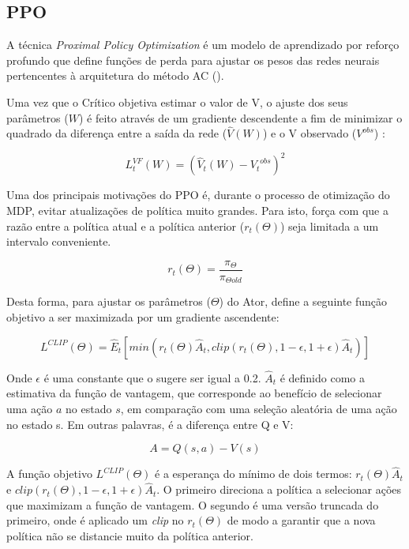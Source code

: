 \subsection{PPO}

A técnica \textit{Proximal Policy Optimization} é um modelo de aprendizado por reforço profundo que define funções de perda para ajustar os pesos das redes neurais pertencentes à arquitetura do método AC (\cite{PPO}). 

Uma vez que o Crítico objetiva estimar o valor de V, o ajuste dos seus parâmetros ($W$) é feito através de um gradiente descendente a fim de minimizar o quadrado da diferença entre a saída da rede ($\hat{V}(W)$) e o V observado ($V^{obs}$) \cite{PPO}:


\begin{equation}
    L^{VF}_t(W) = (\hat{V}_t(W) - {V_t}^{obs})^2 
\end{equation}

\noindent
Uma dos principais motivações do PPO é, durante o processo de otimização do MDP, evitar atualizações de política muito grandes. 
Para isto, \cite{PPO} força com que a razão entre a política atual e a política anterior ($r_t(\Theta)$) seja limitada a um intervalo conveniente. 

\begin{equation}
    r_t(\Theta) = \frac{\pi_\Theta}{\pi_{\Theta old}}
\end{equation}

\noindent
Desta forma, para ajustar os parâmetros ($\Theta$) do Ator, \cite{PPO} define a seguinte função objetivo a ser maximizada por um gradiente ascendente:

\begin{equation}
   L^{CLIP}(\Theta) = \hat{E}_t [min(r_t (\Theta) \hat{A}_t, clip(r_t (\Theta), 1-\epsilon, 1+\epsilon) \hat{A}_t)]
\end{equation}

\noindent
Onde $\epsilon$ é uma constante que o \cite{PPO} sugere ser igual a 0.2. $\hat{A}_t$ é definido como a estimativa da função de vantagem, que corresponde ao benefício de selecionar uma ação $a$ no estado $s$, em comparação com uma seleção aleatória de uma ação no estado s. Em outras palavras, é a diferença entre Q e V:

\begin{equation}
   A = Q(s,a) - V(s)
\end{equation}

A função objetivo $L^{CLIP}(\Theta)$ é a esperança do mínimo de dois termos: $r_t(\Theta) \hat{A}_t$ e $clip(r_t (\Theta), 1-\epsilon, 1+\epsilon) \hat{A}_t$. O primeiro direciona a política a selecionar ações que maximizam a função de vantagem. O segundo é uma versão truncada do primeiro, onde é aplicado um \textit{clip} no $r_t(\Theta)$ de modo a garantir que a nova política não se distancie muito da política anterior. 

